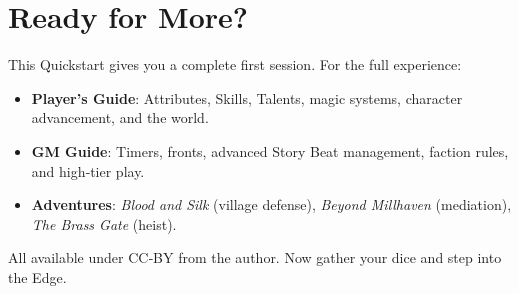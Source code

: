 \documentclass[10pt, twocolumn]{article}
\begin{document}
\section*{Ready for More?}
This Quickstart gives you a complete first session. For the full experience:
\begin{itemize}
\item \textbf{Player's Guide}: Attributes, Skills, Talents, magic systems, character advancement, and the world.
\item \textbf{GM Guide}: Timers, fronts, advanced Story Beat management, faction rules, and high‑tier play.
\item \textbf{Adventures}: \textit{Blood and Silk} (village defense), \textit{Beyond Millhaven} (mediation), \textit{The Brass Gate} (heist).
\end{itemize}
All available under CC‑BY from the author. Now gather your dice and step into the Edge.
\end{document}
